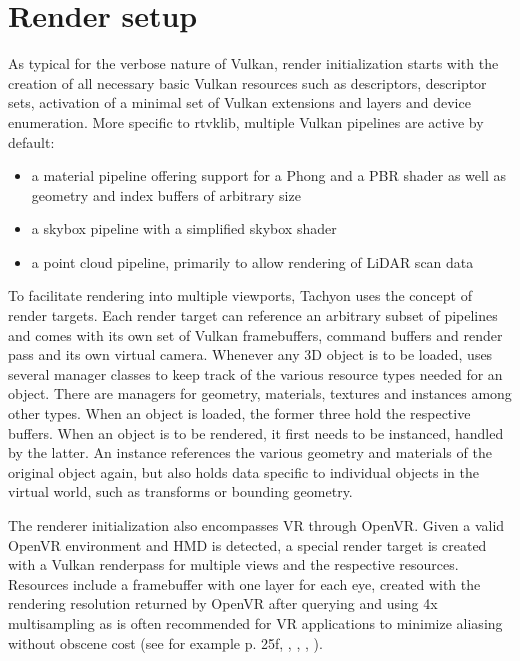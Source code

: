 \section{Render setup} 
As typical for the verbose nature of Vulkan, render initialization starts with the creation of all necessary basic Vulkan resources such as descriptors, descriptor sets, activation of a minimal set of Vulkan extensions and layers and device enumeration. 
More specific to \gls{rtvklib}, multiple Vulkan pipelines are active by default:
\begin{itemize}
\item a material pipeline offering support for a Phong and a PBR shader as well as geometry and index buffers of arbitrary size
\item a skybox pipeline with a simplified skybox shader
\item a point cloud pipeline, primarily to allow rendering of LiDAR scan data
\end{itemize}
To facilitate rendering into multiple viewports, \gls{Tachyon} uses the concept of render targets. Each render target can reference an arbitrary subset of pipelines and comes with its own set of Vulkan framebuffers, command buffers and render pass and its own virtual camera. 
Whenever any 3D object is to be loaded,  uses several manager classes to keep track of the various resource types needed for an object. There are managers for geometry, materials, textures and instances among other types. When an object is loaded, the former three hold the respective buffers. When an object is to be rendered, it first needs to be instanced, handled by the latter. An instance references the various geometry and materials of the original object again, but also holds data specific to individual objects in the virtual world, such as transforms or bounding geometry. 

The renderer initialization also encompasses \gls{VR} through \gls{OpenVR}. Given a valid \gls{OpenVR} environment and \gls{HMD} is detected, a special render target is created with a Vulkan renderpass for multiple views and the respective resources. Resources include a framebuffer with one layer for each eye, created with the rendering resolution returned by \gls{OpenVR} after querying  and using 4x multisampling as is often recommended for \gls{VR} applications to minimize aliasing without obscene cost (see for example \cite{Vlachos.2015} p. 25f, \cite{Porter.2017}, \cite{Carmack.2016}, \cite{VisCircleGmbH.2018}, \cite{Pettit.2017}). 

